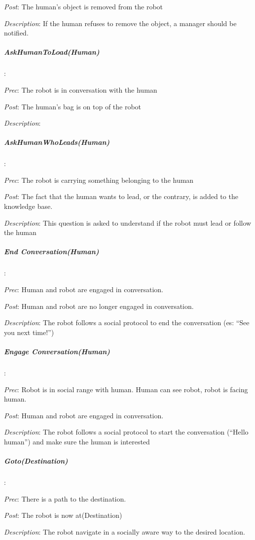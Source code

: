 \textit{Post}: The human's object is removed from the robot

\textit{Description}: If the human refuses to remove the object, a
manager should be notified.


\subparagraph{AskHumanToLoad(Human)}

:

\textit{Prec}: The robot is in conversation with the human

\textit{Post}: The human's bag is on top of the robot

\textit{Description}:


\subparagraph{AskHumanWhoLeads(Human)}

:

\textit{Prec}: The robot is carrying something belonging to the human

\textit{Post}: The fact that the human wants to lead, or the contrary,
is added to the knowledge base.

\textit{Description}: This question is asked to understand if the
robot must lead or follow the human

 


\subparagraph{End Conversation(Human)}

:

\textit{Prec}: Human and robot are engaged in conversation.

\textit{Post}: Human and robot are no longer engaged in conversation.

\textit{Description}: The robot follows a social protocol to end the
conversation (es: ``See you next time!'')


\subparagraph{Engage Conversation(Human)}

:

\textit{Prec}: Robot is in social range with human. Human can see
robot, robot is facing human.

\textit{Post}: Human and robot are engaged in conversation.

\textit{Description}: The robot follows a social protocol to start
the conversation (``Hello human'') and make sure the human is interested


\subparagraph{Goto(Destination)}

:

\textit{Prec}: There is a path to the destination.

\textit{Post}: The robot is now at(Destination)

\textit{Description}: The robot navigate in a socially aware way to
the desired location.


